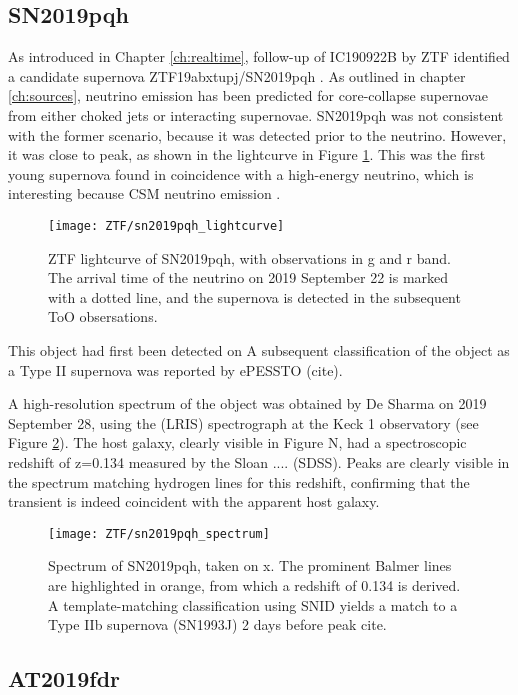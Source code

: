 \subsection{SN2019pqh}
As introduced in Chapter \ref{ch:realtime}, follow-up of IC190922B by ZTF identified a candidate supernova ZTF19abxtupj/SN2019pqh . As outlined in chapter \ref{ch:sources}, neutrino emission has been predicted for core-collapse supernovae from either choked jets or interacting supernovae. SN2019pqh was not consistent with the former scenario, because it was detected prior to the neutrino. However, it was close to peak, as shown in the lightcurve in Figure \ref{fig:sn2019pqh_ligtcurve}. This was the first young supernova found in coincidence with a high-energy neutrino, which is interesting because CSM neutrino emission . 

\begin{figure}[!ht]
	\centering \texttt{[image: ZTF/sn2019pqh\_lightcurve]}
	\caption{ZTF lightcurve of SN2019pqh, with observations in g and r band. The arrival time of the neutrino on 2019 September 22 is marked with a dotted line, and the supernova is detected in the subsequent ToO obsersations.}
	\label{fig:sn2019pqh_ligtcurve}
\end{figure}

This object had first been detected on A subsequent classification of the object as a Type II supernova was reported by ePESSTO (cite). 

A high-resolution spectrum of the object was obtained by De Sharma on 2019 September 28, using the (LRIS) spectrograph at the Keck 1 observatory (see Figure \ref{fig:sn2019pqh_spectrum}). The host galaxy, clearly visible in Figure N, had a spectroscopic redshift of z=0.134 measured by the Sloan .... (SDSS). Peaks are clearly visible in the spectrum matching hydrogen lines for this redshift, confirming that the transient is indeed coincident with the apparent host galaxy.

\begin{figure}[!ht]
	\centering \texttt{[image: ZTF/sn2019pqh\_spectrum]}
	\caption{Spectrum of SN2019pqh, taken on x. The prominent Balmer lines are highlighted in orange, from which a redshift of 0.134 is derived. A template-matching classification using SNID yields a match to a Type IIb supernova (SN1993J) 2 days before peak cite. }
	\label{fig:sn2019pqh_spectrum}
\end{figure}

\subsection{AT2019fdr}

